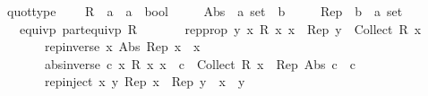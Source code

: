 \begin{isabellebody}
{\isafoldproof}%
%
\isadelimproof
\isanewline
%
\endisadelimproof
\isanewline
{}\isamarkupfalse%
\isanewline
\isanewline
{}\isamarkupfalse%
\ quot{\isacharunderscore}{\kern0pt}type\ {\isacharequal}{\kern0pt}\isanewline
\ \ \ R\ {\isacharcolon}{\kern0pt}{\isacharcolon}{\kern0pt}\ {\isachardoublequoteopen}{\isacharprime}{\kern0pt}a\ {\isasymRightarrow}\ {\isacharprime}{\kern0pt}a\ {\isasymRightarrow}\ bool{\isachardoublequoteclose}\isanewline
\ \ \ \ \ Abs\ {\isacharcolon}{\kern0pt}{\isacharcolon}{\kern0pt}\ {\isachardoublequoteopen}{\isacharprime}{\kern0pt}a\ set\ {\isasymRightarrow}\ {\isacharprime}{\kern0pt}b{\isachardoublequoteclose}\isanewline
\ \ \ \ \ Rep\ {\isacharcolon}{\kern0pt}{\isacharcolon}{\kern0pt}\ {\isachardoublequoteopen}{\isacharprime}{\kern0pt}b\ {\isasymRightarrow}\ {\isacharprime}{\kern0pt}a\ set{\isachardoublequoteclose}\isanewline
\ \ \ equivp{\isacharcolon}{\kern0pt}\ {\isachardoublequoteopen}part{\isacharunderscore}{\kern0pt}equivp\ R{\isachardoublequoteclose}\isanewline
\ \ \ \ \ \ \ rep{\isacharunderscore}{\kern0pt}prop{\isacharcolon}{\kern0pt}\ {\isachardoublequoteopen}{\isasymAnd}y{\isachardot}{\kern0pt}\ {\isasymexists}x{\isachardot}{\kern0pt}\ R\ x\ x\ {\isasymand}\ Rep\ y\ {\isacharequal}{\kern0pt}\ Collect\ {\isacharparenleft}{\kern0pt}R\ x{\isacharparenright}{\kern0pt}{\isachardoublequoteclose}\isanewline
\ \ \ \ \ \ \ rep{\isacharunderscore}{\kern0pt}inverse{\isacharcolon}{\kern0pt}\ {\isachardoublequoteopen}{\isasymAnd}x{\isachardot}{\kern0pt}\ Abs\ {\isacharparenleft}{\kern0pt}Rep\ x{\isacharparenright}{\kern0pt}\ {\isacharequal}{\kern0pt}\ x{\isachardoublequoteclose}\isanewline
\ \ \ \ \ \ \ abs{\isacharunderscore}{\kern0pt}inverse{\isacharcolon}{\kern0pt}\ {\isachardoublequoteopen}{\isasymAnd}c{\isachardot}{\kern0pt}\ {\isacharparenleft}{\kern0pt}{\isasymexists}x{\isachardot}{\kern0pt}\ {\isacharparenleft}{\kern0pt}{\isacharparenleft}{\kern0pt}R\ x\ x{\isacharparenright}{\kern0pt}\ {\isasymand}\ {\isacharparenleft}{\kern0pt}c\ {\isacharequal}{\kern0pt}\ Collect\ {\isacharparenleft}{\kern0pt}R\ x{\isacharparenright}{\kern0pt}{\isacharparenright}{\kern0pt}{\isacharparenright}{\kern0pt}{\isacharparenright}{\kern0pt}\ {\isasymLongrightarrow}\ {\isacharparenleft}{\kern0pt}Rep\ {\isacharparenleft}{\kern0pt}Abs\ c{\isacharparenright}{\kern0pt}{\isacharparenright}{\kern0pt}\ {\isacharequal}{\kern0pt}\ c{\isachardoublequoteclose}\isanewline
\ \ \ \ \ \ \ rep{\isacharunderscore}{\kern0pt}inject{\isacharcolon}{\kern0pt}\ {\isachardoublequoteopen}{\isasymAnd}x\ y{\isachardot}{\kern0pt}\ {\isacharparenleft}{\kern0pt}Rep\ x\ {\isacharequal}{\kern0pt}\ Rep\ y{\isacharparenright}{\kern0pt}\ {\isacharequal}{\kern0pt}\ {\isacharparenleft}{\kern0pt}x\ {\isacharequal}{\kern0pt}\ y{\isacharparenright}{\kern0pt}{\isachardoublequoteclose}\isanewline

\end{isabellebody}
